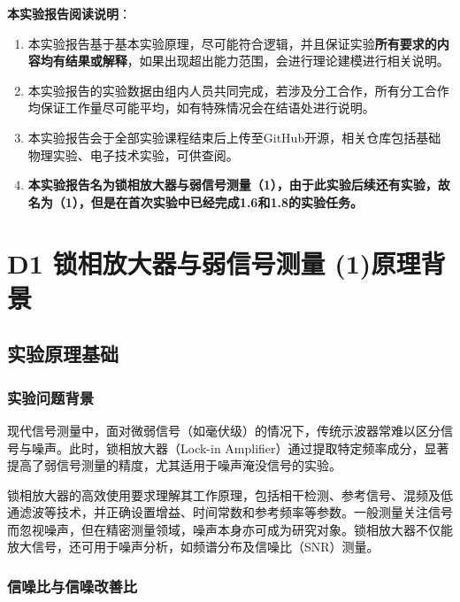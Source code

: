 \documentclass[dvipsnames, svgnames,a4paper,11pt]{article}
\begin{document}
		
	
		
	

	
		
	 \textbf{本实验报告阅读说明}：
		\begin{enumerate}
			\item 本实验报告基于基本实验原理，尽可能符合逻辑，并且保证实验\textbf{所有要求的内容均有结果或解释}，如果出现超出能力范围，会进行理论建模进行相关说明。
			\item 本实验报告的实验数据由组内人员共同完成，若涉及分工合作，所有分工合作均保证工作量尽可能平均，如有特殊情况会在结语处进行说明。
			\item 本实验报告会于全部实验课程结束后上传至GitHub开源，相关仓库包括基础物理实验、电子技术实验，可供查阅。
			\item \textbf{本实验报告名为锁相放大器与弱信号测量（1），由于此实验后续还有实验，故名为（1），但是在首次实验中已经完成1.6和1.8的实验任务。}
		\end{enumerate}
	\clearpage
	\tableofcontents
	\clearpage
	
	
	
	
	\setcounter{section}{0}
	\section{D1 锁相放大器与弱信号测量 (1)\quad\heiti 原理背景}
	
	\subsection{实验原理基础}
	\subsubsection{实验问题背景}
	现代信号测量中，面对微弱信号（如毫伏级）的情况下，传统示波器常难以区分信号与噪声。此时，锁相放大器（Lock-in Amplifier）通过提取特定频率成分，显著提高了弱信号测量的精度，尤其适用于噪声淹没信号的实验。

锁相放大器的高效使用要求理解其工作原理，包括相干检测、参考信号、混频及低通滤波等技术，并正确设置增益、时间常数和参考频率等参数。一般测量关注信号而忽视噪声，但在精密测量领域，噪声本身亦可成为研究对象。锁相放大器不仅能放大信号，还可用于噪声分析，如频谱分布及信噪比（SNR）测量。

\subsubsection{信噪比与信噪改善比}
\end{document}
